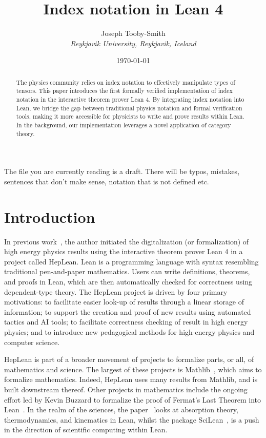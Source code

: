 \documentclass[a4paper, 11pt]{article}
\title{Index notation in Lean 4}
\author{Joseph Tooby-Smith \\ \textit{Reykjavik University, Reykjavik, Iceland}}
\date{\today}
\begin{document}
\maketitle
\vspace{-1cm}
\begin{abstract}
The physics community relies on index notation to effectively manipulate types of tensors.
This paper introduces the first formally verified implementation of index notation in the
interactive theorem prover Lean 4. By integrating index notation into Lean, we bridge the gap between 
traditional physics notation and formal verification tools, 
making it more accessible for physicists to write and prove results within Lean.
In the background, our implementation leverages a novel application of category theory.
\end{abstract}

{\color{mycolor} The file you are currently reading is a draft. There will 
be typos, mistakes, sentences that don't make sense, notation that is not defined etc.}
\section{Introduction}

In previous work~\cite{HepLean}, the author initiated the digitalization (or formalization) 
of high energy physics 
results using the interactive theorem prover Lean 4 in a project called HepLean. 
Lean is a
programming language with syntax resembling traditional pen-and-paper mathematics. 
Users can write definitions, theorems, and proofs in Lean,
which are then automatically checked for correctness using dependent-type theory.
The HepLean project is driven by four primary motivations: to facilitate easier look-up of results
 through a linear storage of information; to support the creation and proof of new results using 
 automated tactics and AI tools; to facilitate correctness checking of result in high energy physics; 
 and to introduce new pedagogical methods for high-energy physics and computer science.

HepLean is part of a broader movement of projects
to formalize parts, or all, of 
mathematics and science. The largest of these projects is Mathlib~\cite{mathlib}, which aims to formalize
mathematics. Indeed, HepLean uses many results from Mathlib, and is built downstream thereof.
Other projects in mathematics include the ongoing effort led by Kevin Buzzard to formalize the proof of Fermat's
Last Theorem into Lean~\cite{FLT}. 
In the realm of the sciences, the paper~\cite{josephson} looks at absorption theory, thermodynamics, and kinematics in Lean, 
whilst the package SciLean~\cite{SciLean}, is a push in the direction of scientific computing within Lean. 
\end{document}
